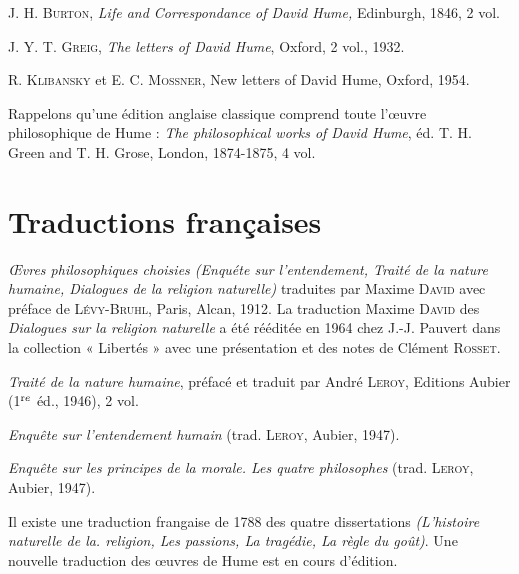 J. H. \textsc{Burton}, {\it Life and Correspondance of David Hume,}
Edinburgh, 1846, 2 vol.

J. Y. T. \textsc{Greig}, {\it The letters of David Hume}, Oxford, 2 vol.,
1932.

R. \textsc{Klibansky} et E. C. \textsc{Mossner}, {\it }New letters of David
Hume, Oxford, 1954.

Rappelons qu’une édition anglaise classique comprend
toute l’{\oe}uvre philosophique de Hume : {\it The philosophical
works of David Hume}, éd. T. H. Green and T. H. Grose,
London, 1874-1875, 4 vol.

\section{Traductions françaises}

{\it Œvres philosophiques choisies (Enquéte sur l'entendement,
Traité de la nature humaine, Dialogues de la religion
naturelle)}  traduites par Maxime \textsc{David} avec préface
de \textsc{Lévy-Bruhl}, Paris, Alcan, 1912. La traduction
Maxime \textsc{David} des {\it Dialogues sur la religion naturelle}
a été rééditée en 1964 chez J.-J. Pauvert dans la collection 
« Libertés » avec une présentation et des notes
de Clément \textsc{Rosset}.

{\it Traité de la nature humaine}, préfacé et traduit par André
\textsc{Leroy}, Editions Aubier (1$^{\text re}$ éd., 1946), 2 vol.

{\it Enquête sur l'entendement humain} (trad. \textsc{Leroy}, Aubier,
1947).

{\it Enquête sur les principes de la morale. Les quatre philosophes} 
(trad. \textsc{Leroy}, Aubier, 1947).

Il existe une traduction frangaise de 1788 des quatre
dissertations {\it (L’histoire naturelle de la. religion, Les passions, 
La tragédie, La règle du goût)}. Une nouvelle traduction 
des {\oe}uvres de Hume est en cours d’édition.

 

 
